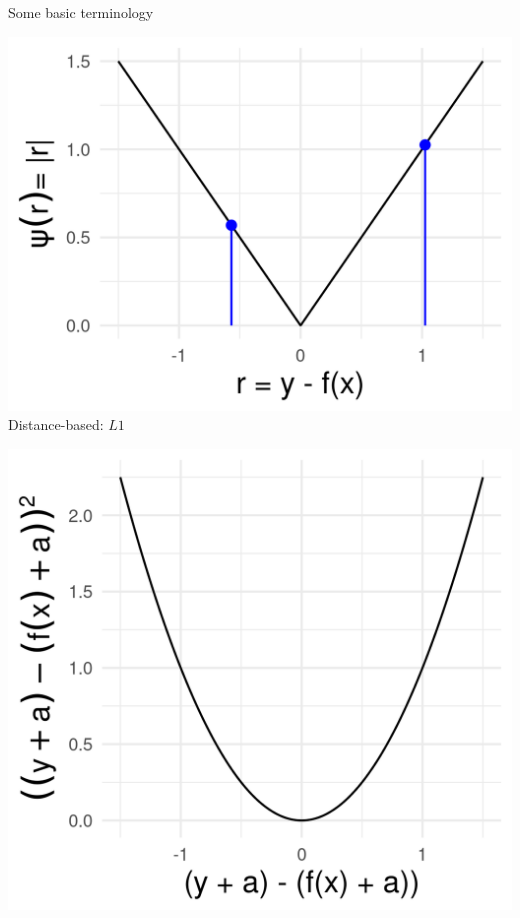 \documentclass[11pt,compress,t,notes=noshow, xcolor=table]{beamer}
\begin{document}
\begin{vbframe}{Some basic terminology}
\begin{minipage}[b]{0.32\textwidth}
  \includegraphics[width=\textwidth]{figure/loss_dist_based}
  \tiny \centering
  Distance-based: $L1$
\end{minipage}%
\begin{minipage}[b]{0.265\textwidth}
  \includegraphics[width=\textwidth]{figure/loss_transl_inv.png}

\end{minipage}
\end{vbframe}
\end{document}
